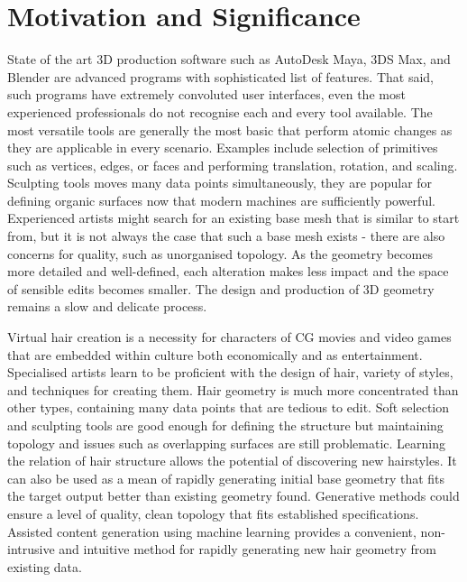 \documentclass[ %
                    author={Dillon Keith Diep},
                supervisor={Dr. Carl Henrik Ek},
                    degree={MEng},
                     title={Assisted Content Generation for 3D Hair Geometry},
                  subtitle={[INCOMPLETE DRAFT, NOT FOR SUBMISSION]},
                      type={Research},
                      year={2014} ]{dissertation}
\begin{document}
\section{Motivation and Significance}
\noindent
State of the art 3D production software such as AutoDesk Maya, 3DS Max, and Blender are advanced programs with sophisticated list of features. That said, such programs have extremely convoluted user interfaces, even the most experienced professionals do not recognise each and every tool available. The most versatile tools are generally the most basic that perform atomic changes as they are applicable in every scenario. Examples include selection of primitives such as vertices, edges, or faces and performing translation, rotation, and scaling. Sculpting tools moves many data points simultaneously, they are popular for defining organic surfaces now that modern machines are sufficiently powerful. Experienced artists might search for an existing base mesh that is similar to start from, but it is not always the case that such a base mesh exists - there are also concerns for quality, such as unorganised topology. As the geometry becomes more detailed and well-defined, each alteration makes less impact and the space of sensible edits becomes smaller. The design and production of 3D geometry remains a slow and delicate process.

Virtual hair creation is a necessity for characters of CG movies and video games that are embedded within culture both economically and as entertainment. Specialised artists learn to be proficient with the design of hair, variety of styles, and techniques for creating them. Hair geometry is much more concentrated than other types, containing many data points that are tedious to edit. Soft selection and sculpting tools are good enough for defining the structure but maintaining topology and issues such as overlapping surfaces are still problematic. Learning the relation of hair structure allows the potential of discovering new hairstyles.  It can also be used as a mean of rapidly generating initial base geometry that fits the target output better than existing geometry found. Generative methods could ensure a level of quality, clean topology that fits established specifications. Assisted content generation using machine learning provides a convenient, non-intrusive and intuitive method for rapidly generating new hair geometry from existing data.
\end{document}
